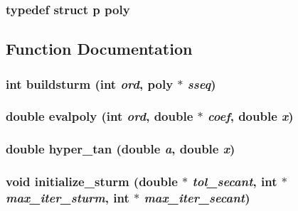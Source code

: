 \subsubsection{\setlength{\rightskip}{0pt plus 5cm}typedef struct {\bf p}  {\bf poly}}\label{PSturm_8h_a872ffc5ff98c9e28919f555b99d6c4e}




\subsection{Function Documentation}
\subsubsection{\setlength{\rightskip}{0pt plus 5cm}int buildsturm (int {\em ord}, {\bf poly} $\ast$ {\em sseq})}\label{PSturm_8h_5eb584e6c8c3763b2106b9f5e7dca185}


\subsubsection{\setlength{\rightskip}{0pt plus 5cm}double evalpoly (int {\em ord}, double $\ast$ {\em coef}, double {\em x})}\label{PSturm_8h_81c3d27ea0df39e91222bd976a9177b7}


\subsubsection{\setlength{\rightskip}{0pt plus 5cm}double hyper\_\-tan (double {\em a}, double {\em x})}\label{PSturm_8h_23a2005738463f1be8b23d441491bdbf}


\subsubsection{\setlength{\rightskip}{0pt plus 5cm}void initialize\_\-sturm (double $\ast$ {\em tol\_\-secant}, int $\ast$ {\em max\_\-iter\_\-sturm}, int $\ast$ {\em max\_\-iter\_\-secant})}\label{PSturm_8h_a87d146754b3d158957bd79f906ed009}


